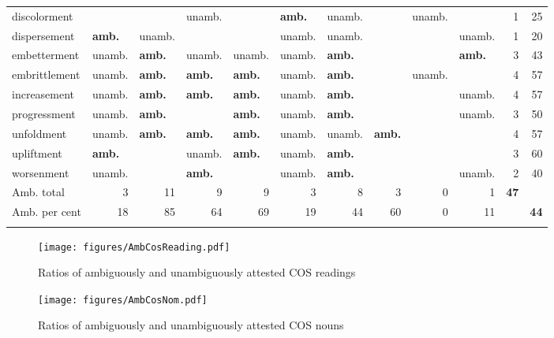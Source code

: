 \begin{sidewaystable}[ph!]
\begin{footnotesize}
\begin{tabular}{llllllllllrr}
discolorment &  &  & unamb. &  & \textbf{amb.} & unamb. &  & unamb. &  & 1 & 25\\
 dispersement & \textbf{amb.} & unamb. &  &  & unamb. & unamb. &  &  & unamb. & 1 & 20\\
embetterment & unamb. & \textbf{amb.} & unamb. & unamb. & unamb. & \textbf{amb.} &  &  & \textbf{amb.} & 3 & 43\\
 embrittlement & unamb. & \textbf{amb.} & \textbf{amb.} & \textbf{amb.} & unamb. & \textbf{amb.} &  & unamb. &  & 4 & 57\\
increasement & unamb. & \textbf{amb.} & \textbf{amb.} & \textbf{amb.} & unamb. & \textbf{amb.} &  &  & unamb. & 4 & 57\\
 progressment & unamb. & \textbf{amb.} &  & \textbf{amb.} & unamb. & \textbf{amb.} &  &  & unamb. & 3 & 50\\
unfoldment & unamb. & \textbf{amb.} & \textbf{amb.} & \textbf{amb.} & unamb. & unamb. & \textbf{amb.} &  &  & 4 & 57\\
 upliftment & \textbf{amb.} &  & unamb. & \textbf{amb.} & unamb. & \textbf{amb.} &  &  &  & 3 & 60\\
worsenment & unamb. &  & \textbf{amb.} &  & unamb. & \textbf{amb.} &  &  & unamb. & 2 & 40\\
\midrule
Amb. total  & \multicolumn{1}{r}{3} & \multicolumn{1}{r}{11} & \multicolumn{1}{r}{9} & \multicolumn{1}{r}{9} & \multicolumn{1}{r}{3} & \multicolumn{1}{r}{8} & \multicolumn{1}{r}{3} & \multicolumn{1}{r}{0} & \multicolumn{1}{r}{1}& \multicolumn{1}{r}{\textbf{47}} & \textendash{} \\
Amb. per cent  & \multicolumn{1}{r}{18} & \multicolumn{1}{r}{85} & \multicolumn{1}{r}{64} & \multicolumn{1}{r}{69} & \multicolumn{1}{r}{19} & \multicolumn{1}{r}{44} & \multicolumn{1}{r}{60} & \multicolumn{1}{r}{0} & \multicolumn{1}{r}{11}& \textendash{} & \multicolumn{1}{r}{\textbf{44}} \\
\lspbottomrule
\end{tabular}
\end{footnotesize}
\end{sidewaystable}

\begin{figure}[p]
\texttt{[image: figures/AmbCosReading.pdf]}
\caption{Ratios of ambiguously and unambiguously attested COS readings}
\label{fig:AmbiguityByReadingCOS}
\end{figure}

\begin{figure}[p]
\texttt{[image: figures/AmbCosNom.pdf]}
\caption{Ratios of ambiguously and unambiguously attested COS nouns}
\label{fig:AmbiguityByNomCOS}
\end{figure}

